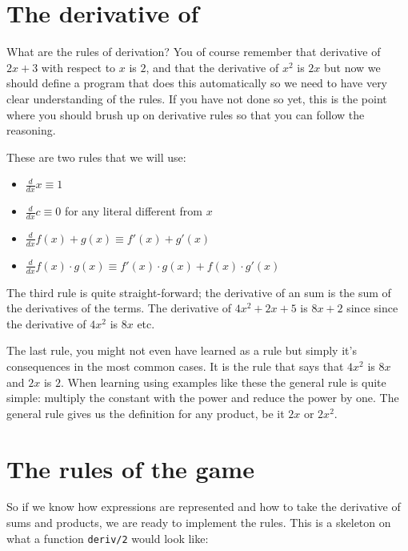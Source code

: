 \documentclass[a4paper,11pt]{article}
\begin{document}
\section{The derivative of}

What are the rules of derivation? You of course remember that derivative
of $2x + 3$ with respect to $x$ is $2$, and that the derivative of
$x^2$ is $2x$ but now we should define a program that does this
automatically so we need to have very clear understanding of the
rules. If you have not done so yet, this is the point where you should
brush up on derivative rules so that you can follow the reasoning.

These are two rules that we will use:

\begin{itemize}
\item $\frac{d}{dx} x \equiv 1$
\item $\frac{d}{dx} c \equiv 0$  for any literal different from $x$
\item $\frac{d}{dx} f(x) + g(x) \equiv  f'(x) + g'(x)$
\item $\frac{d}{dx} f(x) \cdot  g(x) \equiv  f'(x) \cdot  g(x) + f(x) \cdot  g'(x)$
\end{itemize}

\noindent The third rule is quite straight-forward; the derivative of an sum is
the sum of the derivatives of the terms. The derivative of
$4x^{2} + 2x + 5$ is $8x + 2$ since since the derivative of $4x^{2}$
is $8x$ etc.

The last rule, you might not even have learned as a rule but simply
it's consequences in the most common cases. It is the rule that says that
$4x^{2}$ is $8x$ and $2x$ is $2$. When learning using examples like these
the general rule is quite simple: multiply the constant with the power
and reduce the power by one. The general rule gives us the definition
for any product, be it $2x$ or $2x^{2}$.



\section{The rules of the game}

So if we know how expressions are represented and how to take the
derivative of sums and products, we are ready to implement the
rules. This is a skeleton on what a function {\tt deriv/2} would look like:
\end{document}
